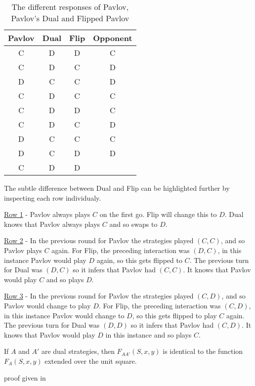 \begin{table}[htbp]
\centering
\begin{tabular}{c c  c | c}
Pavlov & Dual & Flip & Opponent \\
\hline
C & D & D & C\\
C & D & C & D\\
D & C & C & D\\
C & D & C & C\\
C & D & D & C\\
C & D & C & D\\
D & C & C & C\\
D & C & D & D\\
C & D & D &
\end{tabular}
\caption{The different responses of Pavlov, Pavlov's Dual and Flipped Pavlov}
\label{tab:strat-dual-flip}
\end{table}

The subtle difference between Dual and Flip can be highlighted further by inspecting each row individualy.

\underline{Row 1} - Pavlov always plays $C$ on the first go.
Flip will change this to $D$.
Dual knows that Pavlov always plays $C$ and so swaps to $D$.

\underline{Row 2} - In the previous round for Pavlov the strategies played $(C, C)$, and so Pavlov plays $C$ again.
For Flip, the preceding interaction was $(D, C)$, in this instance Pavlov would play $D$ again, so this gets flipped to $C$.
The previous turn for Dual was $(D, C)$ so it infers that Pavlov had $(C, C)$.
It knows that Pavlov would play $C$ and so plays $D$.

\underline{Row 3} - In the previous round for Pavlov the strategies played $(C, D)$, and so Pavlov would change to play $D$.
For Flip, the preceding interaction was $(C, D)$, in this instance Pavlov would change to $D$, so this gets flipped to play $C$ again.
The previous turn for Dual was $(D, D)$ so it infers that Pavlov had $(C, D)$.
It knows that Pavlov would play $D$ in this instance and so plays $C$.



\begin{theorem}\label{thm:fingerprint-unit-square}
If $A$ and $A'$ are dual strategies, then $F_{AA'}(S, x, y)$ is identical to the function $F_A(S, x, y)$ extended over the unit square.
\end{theorem}

proof given in ~\cite{Ashlock2004}









